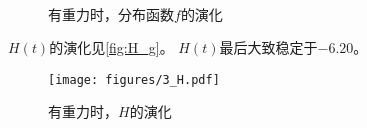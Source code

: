 \documentclass[a4paper,unicode]{report}
\begin{document}
\begin{figure}
    \centering
    \\
    \caption{有重力时，分布函数$f$的演化}
    \label{fig:f_zp_g}
\end{figure}

$H(t)$的演化见\autoref{fig:H_g}。
$H(t)$最后大致稳定于$-6.20$。

\begin{figure}
    \centering
    \texttt{[image: figures/3\_H.pdf]}
    \caption{有重力时，$H$的演化}
    \label{fig:H_g}
\end{figure}
\end{document}
